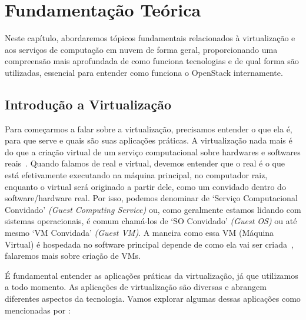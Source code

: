 \chapter{Fundamentação Teórica}

Neste capítulo, abordaremos tópicos fundamentais relacionados à virtualização e aos serviços de computação em nuvem de forma geral, proporcionando uma compreensão mais aprofundada de como funciona tecnologias e de qual forma são utilizadas, essencial para entender como funciona o OpenStack internamente.


\section{Introdução a Virtualização}

Para começarmos a falar sobre a virtualização, precisamos entender o que ela é, para que serve e quais são suas aplicações práticas. A virtualização nada mais é do que a criação virtual de um serviço computacional sobre hardwares e softwares reais~\citep{chirammal2016mastering}. Quando falamos de real e virtual, devemos entender que o real é o que está efetivamente executando na máquina principal, no computador raiz, enquanto o virtual será originado a partir dele, como um convidado dentro do software/hardware real. Por isso, podemos denominar de `Serviço Computacional Convidado' \textit{(Guest Computing Service)} ou, como geralmente estamos lidando com sistemas operacionais, é comum chamá-los de `SO Convidado' \textit{(Guest OS)} ou até mesmo `VM Convidada' \textit{(Guest VM)}. A maneira como essa VM (Máquina Virtual) é hospedada no software principal depende de como ela vai ser criada~\citep{chirammal2016mastering}, falaremos mais sobre criação de VMs.

 É fundamental entender as aplicações práticas da virtualização, já que utilizamos a todo momento. As aplicações de virtualização são diversas e abrangem diferentes aspectos da tecnologia. Vamos explorar algumas dessas aplicações como mencionadas por \cite{chirammal2016mastering}:

